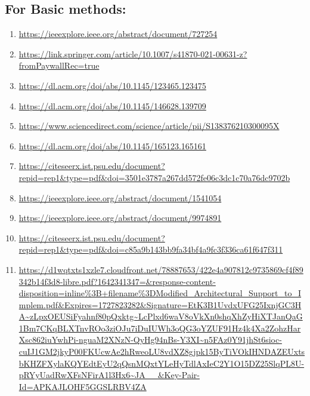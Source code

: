 \documentclass[12pt]{article}
\begin{document}
\subsection*{For Basic methods: }
\begin{enumerate}
    \item \url{https://ieeexplore.ieee.org/abstract/document/727254}
    \item \url{https://link.springer.com/article/10.1007/s41870-021-00631-z?fromPaywallRec=true}
    \item \url{https://dl.acm.org/doi/abs/10.1145/123465.123475}
    \item \url{https://dl.acm.org/doi/abs/10.1145/146628.139709}
    \item \url{https://www.sciencedirect.com/science/article/pii/S138376210300095X}
    \item \url{https://dl.acm.org/doi/abs/10.1145/165123.165161}
    \item \url{https://citeseerx.ist.psu.edu/document?repid=rep1&type=pdf&doi=3501e3787a267dd572fe06c3dc1c70a76dc9702b}
    \item \url{https://ieeexplore.ieee.org/abstract/document/1541054}
    \item \url{https://ieeexplore.ieee.org/abstract/document/9974891}
    \item \url{https://citeseerx.ist.psu.edu/document?repid=rep1&type=pdf&doi=c85a9b143bb9fa34bf4a9fc3f336ca61f647f311}
    \item \url{https://d1wqtxts1xzle7.cloudfront.net/78887653/422e4a907812c9735869cf4f89342b14f3d8-libre.pdf?1642341347=&response-content-disposition=inline%3B+filename%3DModified_Architectural_Support_to_Implem.pdf&Expires=1727823282&Signature=EtK3B1UvdxUFG25IxnjGC3HA~zLpxOEUSiFyahnf80pQxktg~LcPlxd6waV8oVkXn0shqXhZyHiXTJanQaG1Bm7CKqBLXTnvROo3ziOJu7iDuIUWh3oQG3oYZUF91Hz4k4Xa2ZohzHarXsc862iuYwhPi-nguaM2XNzN-QyHg94nBs-Y3XI~n5FAz0Y91jhSt6sioc-cuIJ1GM2jkyP00FKUcwAe2hRweoLU8vdXZ8gjpk15ByTiVOkIHNDAZEUxtsbKHZFXylaKQYEdtEyU2qQsnMQxtYLeHyTdlAxIeC2Y1O15DZ25SlqPL8U-pRYyUadRwXFsNFirA1l3Hx6~JA__&Key-Pair-Id=APKAJLOHF5GGSLRBV4ZA}
\end{enumerate}
\end{document}

